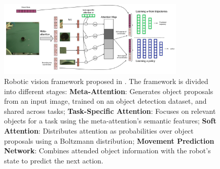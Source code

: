 \begin{figure}[t]
    \centering
    \includegraphics[width=0.8\textwidth]{figures/images/object_prior_framework.jpg}
    \caption{
            Robotic vision framework proposed in \cite{devin2018deep}. The framework is divided into different stages: \textbf{Meta-Attention}: Generates object proposals from an input image, trained on an object detection dataset, and shared across tasks; \textbf{Task-Specific Attention}: Focuses on relevant objects for a task using the meta-attention's semantic features; \textbf{Soft Attention}: Distributes attention as probabilities over object proposals using a Boltzmann distribution; \textbf{Movement Prediction Network}: Combines attended object information with the robot's state to predict the next action.
        }
    \label{fig:object_prior_framework}
\end{figure}